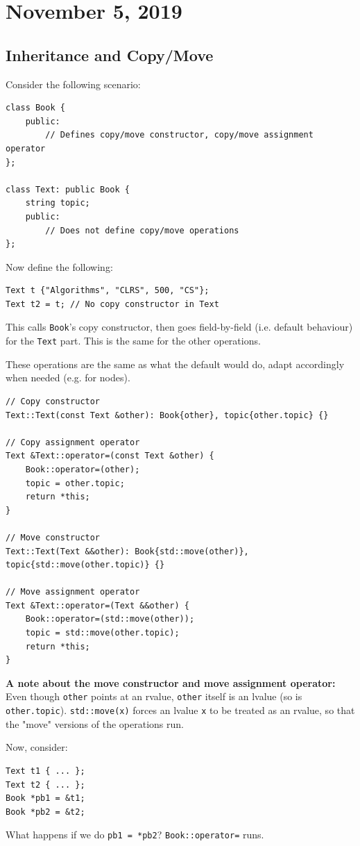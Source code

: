 \documentclass[11pt]{article}
\theoremstyle{definition}
\begin{document}
\newpage
\section{November 5, 2019}

\subsection{Inheritance and Copy/Move}
Consider the following scenario:
\begin{lstlisting}
class Book {
    public:
        // Defines copy/move constructor, copy/move assignment operator
};

class Text: public Book {
    string topic;
    public:
        // Does not define copy/move operations
};
\end{lstlisting}
\vspace{-0.25cm}
Now define the following:
\begin{lstlisting}
Text t {"Algorithms", "CLRS", 500, "CS"};
Text t2 = t; // No copy constructor in Text
\end{lstlisting}
\vspace{-0.25cm}
This calls {\tt Book}'s copy constructor, then goes field-by-field (i.e. default behaviour) for the {\tt Text} part. This is the same for the other operations.

These operations are the same as what the default would do, adapt accordingly when needed (e.g. for nodes).
\begin{lstlisting}
// Copy constructor
Text::Text(const Text &other): Book{other}, topic{other.topic} {}

// Copy assignment operator
Text &Text::operator=(const Text &other) {
    Book::operator=(other);
    topic = other.topic;
    return *this;
}

// Move constructor
Text::Text(Text &&other): Book{std::move(other)}, topic{std::move(other.topic)} {}

// Move assignment operator
Text &Text::operator=(Text &&other) {
    Book::operator=(std::move(other));
    topic = std::move(other.topic);
    return *this;
}
\end{lstlisting}
{\bf A note about the move constructor and move assignment operator:} \\ Even though {\tt other} points at an rvalue, {\tt other} itself is an lvalue (so is {\tt other.topic}). {\tt std::move(x)} forces an lvalue {\tt x} to be treated as an rvalue, so that the "move" versions of the operations run.

Now, consider:
\begin{lstlisting}
Text t1 { ... };
Text t2 { ... };
Book *pb1 = &t1;
Book *pb2 = &t2;
\end{lstlisting}
\vspace{-0.25cm}
What happens if we do {\tt *pb1 = *pb2}? {\tt Book::operator=} runs.
\end{document}
